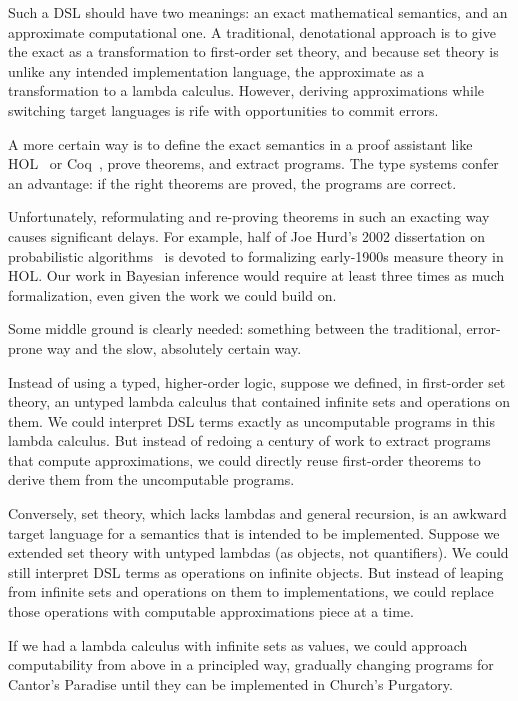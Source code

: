 Such a DSL should have two meanings: an exact mathematical semantics, and an approximate computational one. A traditional, denotational approach is to give the exact as a transformation to first-order set theory, and because set theory is unlike any intended implementation language, the approximate as a transformation to a lambda calculus. However, deriving approximations while switching target languages is rife with opportunities to commit errors.

A more certain way is to define the exact semantics in a proof assistant like HOL~\cite{leivant-1994-hol} or Coq~\cite{cit:book-coqart}, prove theorems, and extract programs. The type systems confer an advantage: if the right theorems are proved, the programs are correct.

Unfortunately, reformulating and re-proving theorems in such an exacting way causes significant delays. For example, half of Joe Hurd's 2002 dissertation on probabilistic algorithms~\cite{cit:hurd-2002thesis} is devoted to formalizing early-1900s measure theory in HOL. Our work in Bayesian inference would require at least three times as much formalization, even given the work we could build on.

Some middle ground is clearly needed: something between the traditional, error-prone way and the slow, absolutely certain way.

Instead of using a typed, higher-order logic, suppose we defined, in first-order set theory, an untyped lambda calculus that contained infinite sets and operations on them. We could interpret DSL terms exactly as uncomputable programs in this lambda calculus. But instead of redoing a century of work to extract programs that compute approximations, we could directly reuse first-order theorems to derive them from the uncomputable programs.

Conversely, set theory, which lacks lambdas and general recursion, is an awkward target language for a semantics that is intended to be implemented. Suppose we extended set theory with untyped lambdas (as objects, not quantifiers). We could still interpret DSL terms as operations on infinite objects. But instead of leaping from infinite sets and operations on them to implementations, we could replace those operations with computable approximations piece at a time.

If we had a lambda calculus with infinite sets as values, we could approach computability from above in a principled way, gradually changing programs for Cantor's Paradise until they can be implemented in Church's Purgatory.


